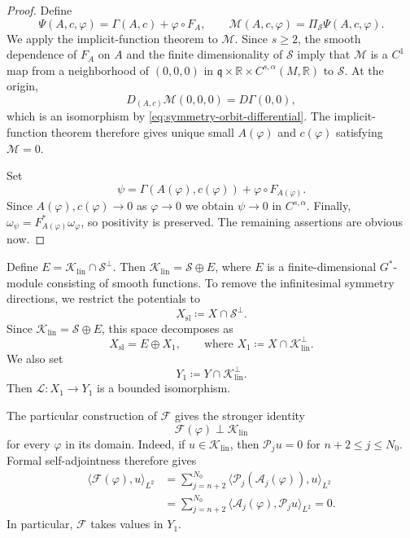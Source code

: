 \documentclass[11pt,reqno]{amsart}
\theoremstyle{corollary}
\theoremstyle{conjecture}
\theoremstyle{assumption}
\theoremstyle{proposition}
\theoremstyle{remark}
\numberwithin{equation}{section}
\begin{document}
\begin{proof}
Define
\[
\Psi(A,c,\varphi)=\Gamma(A,c)+\varphi\circ F_A,\qquad \mathcal M(A,c,\varphi)=\Pi_{\mathcal S}\Psi(A,c,\varphi).
\]
We apply the implicit-function theorem to $\mathcal M$. Since $s\geq 2$, the smooth dependence of $F_A$ on $A$ and the finite dimensionality of $\mathcal S$ imply that $\mathcal M$ is a $C^1$ map from a neighborhood of $(0,0,0)$ in $\mathfrak q\times\mathbb R\times C^{s,\alpha}(M,\mathbb R)$ to $\mathcal S$. At the origin,
\[
D_{(A,c)}\mathcal M(0,0,0)=D\Gamma(0,0),
\]
which is an isomorphism by \eqref{eq:symmetry-orbit-differential}. The implicit-function theorem therefore gives unique small $A(\varphi)$ and $c(\varphi)$ satisfying $\mathcal M=0$.

Set
\[
\psi=\Gamma(A(\varphi),c(\varphi))+\varphi\circ F_{A(\varphi)}.
\]
Since $A(\varphi),c(\varphi)\rightarrow 0$ as $\varphi\rightarrow0$ we obtain $\psi\rightarrow 0$ in $C^{s,\alpha}$. Finally, $\omega_\psi=F_{A(\varphi)}^*\omega_\varphi$, so positivity is preserved. The remaining assertions are obvious now.
\end{proof}

Define $E=\mathcal K_{\operatorname{lin}}\cap\mathcal S^\perp$. Then $\mathcal K_{\operatorname{lin}}=\mathcal S\oplus E$, where $E$ is a finite-dimensional $G^*$-module consisting of smooth functions. To remove the infinitesimal symmetry directions, we restrict the potentials to
\[
X_{\mathrm{sl}}\coloneq X\cap\mathcal S^\perp.
\]
Since $\mathcal K_{\operatorname{lin}}=\mathcal S\oplus E$, this space decomposes as
\[
X_{\mathrm{sl}}=E\oplus X_1,\qquad \text{where }X_1\coloneq X\cap\mathcal K_{\operatorname{lin}}^\perp.
\]
We also set
\[
Y_1\coloneq Y\cap\mathcal K_{\operatorname{lin}}^\perp.
\]
Then $\mathcal L:X_1\longrightarrow Y_1$ is a bounded isomorphism.

The particular construction of $\mathcal F$ gives the stronger identity
\begin{equation}\label{eq:finite-map-orthogonality}
\mathcal F(\varphi)
\perp\mathcal K_{\operatorname{lin}}
\end{equation}
for every $\varphi$ in its domain.
Indeed, if $u\in\mathcal K_{\operatorname{lin}}$, then $\mathcal P_j u=0$ for $n+2\leq j\leq N_0$. Formal self-adjointness therefore gives
\[
\begin{aligned}
\langle\mathcal F(\varphi),u\rangle_{L^2}&=\sum_{j=n+2}^{N_0}\langle\mathcal P_j\left(\mathcal A_j(\varphi)\right),u\rangle_{L^2}\\
&=\sum_{j=n+2}^{N_0}\langle\mathcal A_j(\varphi),\mathcal P_j u\rangle_{L^2}=0.
\end{aligned}
\]
In particular, $\mathcal F$ takes values in $Y_1$.
\end{document}
